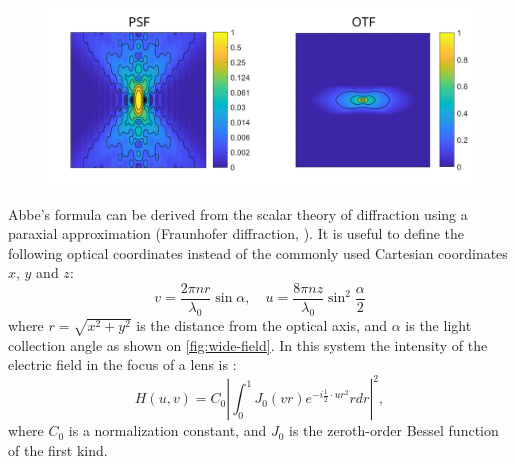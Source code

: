     \begin{figure}
      \centering
      \includegraphics[width=1\textwidth]{psfs/WF.pdf}
      \label{fig:psf-wf}
    \end{figure}


    Abbe's formula can be derived from the scalar theory of diffraction using a paraxial approximation (Fraunhofer diffraction, \cite{born_principles_2013}).
    It is useful to define the following optical coordinates instead of the commonly used Cartesian coordinates $x$, $y$ and $z$:
    \begin{equation}
      v = \frac{2\pi n  r}{\lambda_0} \sin \alpha, \quad
      u=\frac{8\pi n  z}{\lambda_0} \sin^2 \frac{\alpha}{2}
      \label{eq:substitutions}
    \end{equation}
    where $r = \sqrt{x^2 + y^2}$ is the distance from the optical axis, and $\alpha$ is the light collection angle as shown on \autoref{fig:wide-field}. In this system the intensity of the electric field in the focus of a lens is \cite{sheppard_imaging_1987}:
    \begin{equation}
      H(u,v) = C_0 \left| \int_0^1 J_0 (vr)e^{-i\frac{1}{2}\cdot ur^2} rdr \right|^2,
      \label{eq:psf}
    \end{equation}
    where $C_0$ is a normalization constant, and $J_0$ is the zeroth-order Bessel function of the first kind.
    
    

